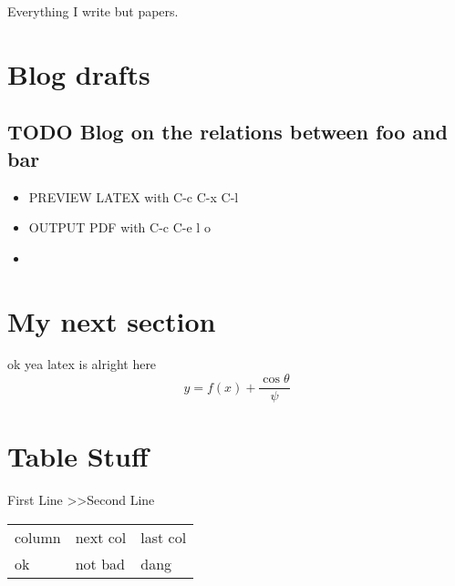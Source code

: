 \documentclass[11pt]{article}
\author{Zain Karsan}
\date{\today}
\title{}
\begin{document}
\tableofcontents

Everything I write but papers.

\section{Blog drafts}
\label{sec:org5d21f40}
\subsection{{\bfseries\sffamily TODO} Blog on the relations between foo and bar}
\label{sec:orgdddd4ba}
\begin{itemize}
\item PREVIEW LATEX with C-c C-x C-l
\item OUTPUT PDF with C-c C-e l o
\item 
\end{itemize}

\section{My next section}
\label{sec:orgf4daffc}

ok yea latex is alright here
\begin{equation}
y = f(x) + \dfrac{\cos{\theta}}{\psi}
\end{equation}

\section{Table Stuff}
\label{sec:orga4c743b}

First Line
>>Second Line

\begin{center}
\begin{tabular}{lll}
column & next col & last col\\[0pt]
ok & not bad & dang\\[0pt]
\end{tabular}
\end{center}
\end{document}
